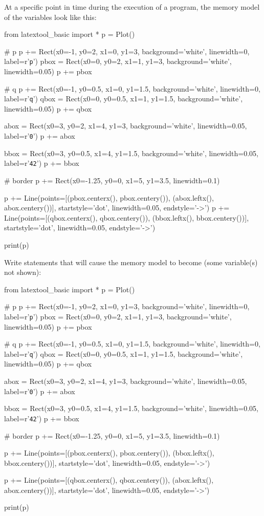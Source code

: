 

\nextq
At a specific point in time during the execution of
a program, the memory model of the variables look like this:
\begin{python}
from latextool_basic import *
p = Plot()

# p
p += Rect(x0=-1, y0=2, x1=0, y1=3, background='white', linewidth=0, label=r'\texttt{p}')
pbox = Rect(x0=0, y0=2, x1=1, y1=3, background='white', linewidth=0.05)
p += pbox

# q
p += Rect(x0=-1, y0=0.5, x1=0, y1=1.5, background='white', linewidth=0, label=r'\texttt{q}')
qbox = Rect(x0=0, y0=0.5, x1=1, y1=1.5, background='white', linewidth=0.05)
p += qbox

abox = Rect(x0=3, y0=2, x1=4, y1=3, background='white', linewidth=0.05,
            label=r'\texttt{0}')
p += abox

bbox = Rect(x0=3, y0=0.5, x1=4, y1=1.5, background='white', linewidth=0.05,
            label=r'\texttt{42}')
p += bbox

# border
p += Rect(x0=-1.25, y0=0, x1=5, y1=3.5, linewidth=0.1)

p += Line(points=[(pbox.centerx(), pbox.centery()),
                  (abox.leftx(), abox.centery())],
          startstyle='dot', linewidth=0.05,
          endstyle='->')
p += Line(points=[(qbox.centerx(), qbox.centery()),
                  (bbox.leftx(), bbox.centery())],
          startstyle='dot', linewidth=0.05,
          endstyle='->')

print(p)
\end{python}
Write statements that will cause the memory model to become
(some variable(s) not shown):
\begin{python}
from latextool_basic import *
p = Plot()

# p
p += Rect(x0=-1, y0=2, x1=0, y1=3, background='white', linewidth=0, label=r'\texttt{p}')
pbox = Rect(x0=0, y0=2, x1=1, y1=3, background='white', linewidth=0.05)
p += pbox

# q
p += Rect(x0=-1, y0=0.5, x1=0, y1=1.5, background='white', linewidth=0, label=r'\texttt{q}')
qbox = Rect(x0=0, y0=0.5, x1=1, y1=1.5, background='white', linewidth=0.05)
p += qbox

abox = Rect(x0=3, y0=2, x1=4, y1=3, background='white', linewidth=0.05,
            label=r'\texttt{0}')
p += abox

bbox = Rect(x0=3, y0=0.5, x1=4, y1=1.5, background='white', linewidth=0.05,
            label=r'\texttt{42}')
p += bbox

# border
p += Rect(x0=-1.25, y0=0, x1=5, y1=3.5, linewidth=0.1)

p += Line(points=[(pbox.centerx(), pbox.centery()),
                  (bbox.leftx(), bbox.centery())],
          startstyle='dot', linewidth=0.05,
          endstyle='->')

p += Line(points=[(qbox.centerx(), qbox.centery()),
                  (abox.leftx(), abox.centery())],
          startstyle='dot', linewidth=0.05,
          endstyle='->')

print(p)
\end{python}
